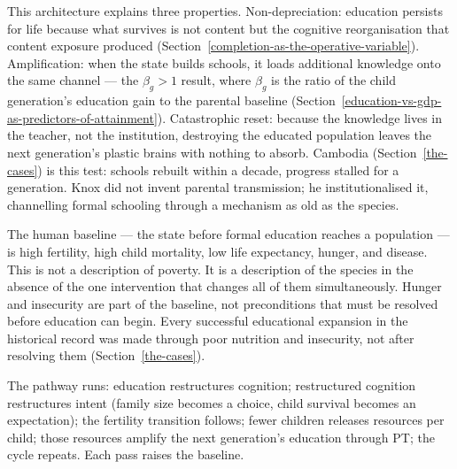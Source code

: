 \documentclass[12pt,letterpaper]{article}
\begin{document}
This architecture explains three properties. Non-depreciation: education
persists for life because what survives is not content but the cognitive
reorganisation that content exposure produced
(Section~\ref{completion-as-the-operative-variable}). Amplification: when the state builds
schools, it loads additional knowledge onto the same channel --- the
$\beta_g > 1$ result, where $\beta_g$ is the ratio of the child
generation's education gain to the parental baseline
(Section~\ref{education-vs-gdp-as-predictors-of-attainment}). Catastrophic reset: because the
knowledge lives in the teacher, not the institution, destroying the
educated population leaves the next generation's plastic brains with
nothing to absorb. Cambodia (Section~\ref{the-cases}) is this test: schools rebuilt
within a decade, progress stalled for a generation. Knox did not invent
parental transmission; he institutionalised it, channelling formal
schooling through a mechanism as old as the species.

The human baseline --- the state before formal education reaches a
population --- is high fertility, high child mortality, low life
expectancy, hunger, and disease. This is not a description of poverty.
It is a description of the species in the absence of the one
intervention that changes all of them simultaneously. Hunger and
insecurity are part of the baseline, not preconditions that must be
resolved before education can begin. Every successful educational
expansion in the historical record was made through poor nutrition and
insecurity, not after resolving them (Section~\ref{the-cases}).

The pathway runs: education restructures cognition; restructured
cognition restructures intent (family size becomes a choice, child
survival becomes an expectation); the fertility transition follows;
fewer children releases resources per child; those resources amplify the
next generation's education through PT; the cycle repeats. Each pass
raises the baseline.
\end{document}
